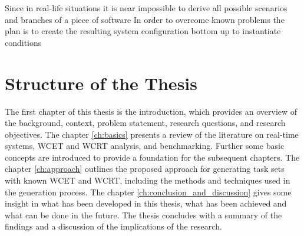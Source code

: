 Since in real-life situations it is near impossible to derive all possible scenarios and branches of a piece of software 
In order to overcome known problems the plan is to create the resulting system configuration bottom up to instantiate conditions 

\section{Structure of the Thesis}\label{sec:structure} 
The first chapter of this thesis is the introduction, which provides an overview of the background, context, problem statement, research questions, and research objectives.
The chapter \cref{ch:basics} presents a review of the literature on real-time systems, \ac{WCET} and \ac{WCRT} analysis, and benchmarking.
Further some basic concepts are introduced to provide a foundation for the subsequent chapters.
The chapter \cref{ch:approach} outlines the proposed approach for generating task sets with known \ac{WCET} and \ac{WCRT}, including the methods and techniques used in the generation process.
The chapter \cref{ch:conclusion_and_discussion} gives some insight in what has been developed in this thesis, what has been achieved and what can be done in the future.
The thesis concludes with a summary of the findings and a discussion of the implications of the research.
